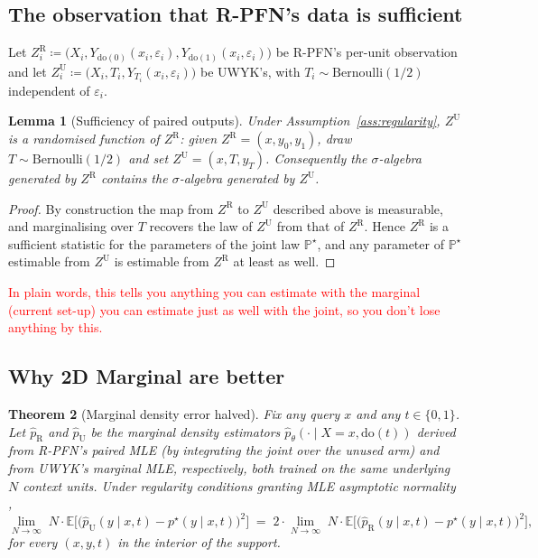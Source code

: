 \documentclass[11pt]{article}
\newtheorem{theorem}{Theorem}
\newtheorem{lemma}[theorem]{Lemma}
\theoremstyle{remark}
\newcommand{\PP}{\mathbb{P}}
\newcommand{\EE}{\mathbb{E}}
\begin{document}
\subsection{The observation that R-PFN's data is sufficient}

Let $Z_i^{\mathrm{R}} \coloneqq \bigl(X_i, Y_{\mathrm{do}(0)}(x_i, \varepsilon_i),
Y_{\mathrm{do}(1)}(x_i, \varepsilon_i)\bigr)$ be R-PFN's per-unit
observation and let
$Z_i^{\mathrm{U}} \coloneqq \bigl(X_i, T_i, Y_{T_i}(x_i, \varepsilon_i)\bigr)$
be UWYK's, with $T_i \sim \mathrm{Bernoulli}(1/2)$ independent of
$\varepsilon_i$.

\begin{lemma}[Sufficiency of paired outputs]
\label{lem:sufficiency}
Under Assumption~\ref{ass:regularity}, $Z^{\mathrm{U}}$ is a randomised
function of $Z^{\mathrm{R}}$: given $Z^{\mathrm{R}} = (x, y_0, y_1)$,
draw $T \sim \mathrm{Bernoulli}(1/2)$ and set $Z^{\mathrm{U}} = (x, T, y_T)$.
Consequently the $\sigma$-algebra generated by $Z^{\mathrm{R}}$ contains
the $\sigma$-algebra generated by $Z^{\mathrm{U}}$.
\end{lemma}

\begin{proof}
By construction the map from $Z^{\mathrm{R}}$ to $Z^{\mathrm{U}}$
described above is measurable, and marginalising over $T$ recovers the
law of $Z^{\mathrm{U}}$ from that of $Z^{\mathrm{R}}$. Hence
$Z^{\mathrm{R}}$ is a sufficient statistic for the parameters of the
joint law $\PP^\star$, and any parameter of $\PP^\star$ estimable from
$Z^{\mathrm{U}}$ is estimable from $Z^{\mathrm{R}}$ at least as well.
\end{proof}

\textcolor{red}{In plain words, this tells you anything you can estimate with the marginal (current set-up) you can estimate just as well with the joint, so you don't lose anything by this.}

\subsection{Why 2D Marginal are better}

\begin{theorem}[Marginal density error halved]
\label{thm:marg-half}
Fix any query $x$ and any $t \in \{0, 1\}$. Let $\hat p_{\mathrm{R}}$
and $\hat p_{\mathrm{U}}$ be the marginal density estimators
$\hat p_\theta(\cdot \mid X = x, \mathrm{do}(t))$ derived from R-PFN's
paired MLE (by integrating the joint over the unused arm) and from
UWYK's marginal MLE, respectively, both trained on the same underlying
$N$ context units. Under regularity conditions granting MLE
asymptotic normality \citep{van-der-vaart-1998-asymptotic-statistics},
\begin{equation}
  \lim_{N \to \infty}\; N \cdot
    \EE\!\bigl[\bigl(\hat p_{\mathrm{U}}(y \mid x, t) - p^\star(y \mid x, t)\bigr)^2\bigr]
  \;=\;
  2 \cdot
  \lim_{N \to \infty}\; N \cdot
    \EE\!\bigl[\bigl(\hat p_{\mathrm{R}}(y \mid x, t) - p^\star(y \mid x, t)\bigr)^2\bigr],
  \label{eq:marg-half}
\end{equation}
for every $(x, y, t)$ in the interior of the support.
\end{theorem}
\end{document}
